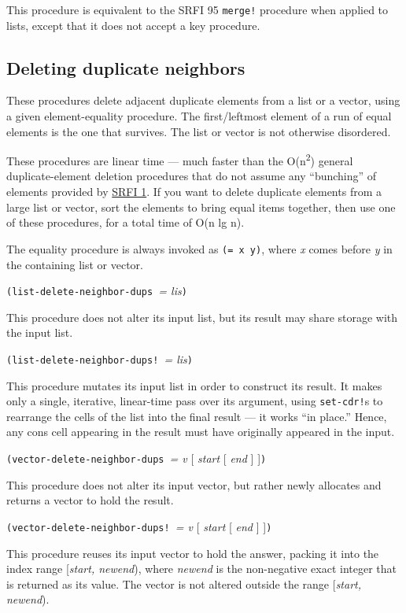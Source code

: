 This procedure is equivalent to the SRFI 95 \texttt{merge!} procedure
when applied to lists, except that it does not accept a key procedure.

\subsection{Deleting duplicate
neighbors}\label{Deletingduplicateneighbors}

These procedures delete adjacent duplicate elements from a list or a
vector, using a given element-equality procedure. The first/leftmost
element of a run of equal elements is the one that survives. The list or
vector is not otherwise disordered.

These procedures are linear time --- much faster than the
O(n\textsuperscript{2}) general duplicate-element deletion procedures
that do not assume any ``bunching'' of elements provided by
\href{http://srfi.schemers.org/srfi-1/srfi-1.html}{SRFI 1}. If you want
to delete duplicate elements from a large list or vector, sort the
elements to bring equal items together, then use one of these
procedures, for a total time of O(n lg n).

The equality procedure is always invoked as \texttt{(=\ x\ y)}, where
\emph{x} comes before \emph{y} in the containing list or vector.

\texttt{(list-delete-neighbor-dups\ }\emph{= lis}\texttt{)}

This procedure does not alter its input list, but its result may share
storage with the input list.

\texttt{(list-delete-neighbor-dups!\ }\emph{= lis}\texttt{)}

This procedure mutates its input list in order to construct its result.
It makes only a single, iterative, linear-time pass over its argument,
using \texttt{set-cdr!}s to rearrange the cells of the list into the
final result --- it works ``in place.'' Hence, any cons cell appearing
in the result must have originally appeared in the input.

\texttt{(vector-delete-neighbor-dups\ }\emph{= v} {[} \emph{start} {[}
\emph{end} {]} {]}\texttt{)}

This procedure does not alter its input vector, but rather newly
allocates and returns a vector to hold the result.

\texttt{(vector-delete-neighbor-dups!\ }\emph{= v} {[} \emph{start} {[}
\emph{end} {]} {]}\texttt{)}

This procedure reuses its input vector to hold the answer, packing it
into the index range {[}\emph{start, newend}), where \emph{newend} is
the non-negative exact integer that is returned as its value. The vector
is not altered outside the range {[}\emph{start, newend}).

